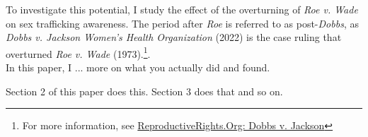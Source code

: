 To investigate this potential, I study the effect of the overturning of \textit{Roe v. Wade} on sex trafficking awareness. The period after \textit{Roe} is referred to as post-\textit{Dobbs}, as \textit{Dobbs v. Jackson Women’s Health Organization} (2022) is the case ruling that overturned \textit{Roe v. Wade} (1973).\footnote{For more information, see \href{https://reproductiverights.org/cases/scotus-mississippi-abortion-ban-dobbs-jackson-womens-health/}{ReproductiveRights.Org: Dobbs v. Jackson}}.\\
[A little more here on the general effect of the overturning of Roe on access]

In this paper, I ... more on what you actually did and found. 

Section 2 of this paper does this. Section 3 does that and so on. 

